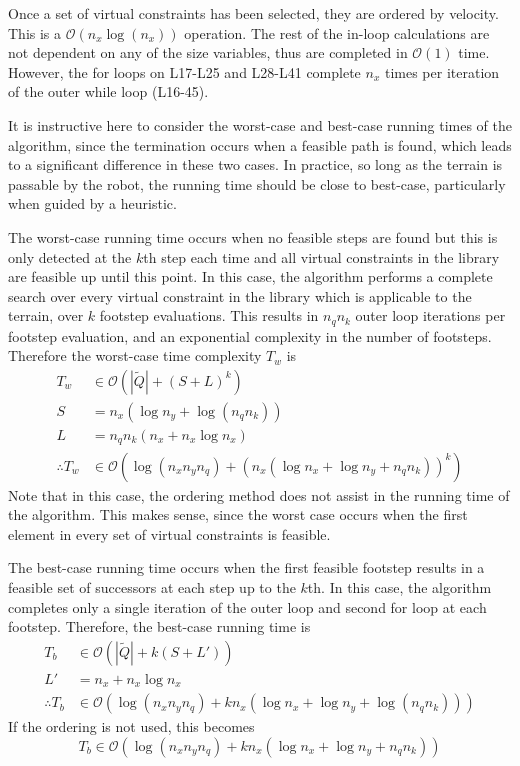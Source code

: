 Once a set of virtual constraints has been selected, they are ordered by velocity. This is a $\mathcal{O}(n_x\log(n_x))$ operation. The rest of the in-loop calculations are not dependent on any of the size variables, thus are completed in $\mathcal{O}(1)$ time. However, the for loops on L17-L25 and L28-L41 complete $n_x$ times per iteration of the outer while loop (L16-45).

It is instructive here to consider the worst-case and best-case running times of the algorithm, since the termination occurs when a feasible path is found, which leads to a significant difference in these two cases. In practice, so long as the terrain is passable by the robot, the running time should be close to best-case, particularly when guided by a heuristic.

The worst-case running time occurs when no feasible steps are found but this is only detected at the $k$th step each time and all virtual constraints in the library are feasible up until this point. In this case, the algorithm performs a complete search over every virtual constraint in the library which is applicable to the terrain, over $k$ footstep evaluations. This results in $n_qn_k$ outer loop iterations per footstep evaluation, and an exponential complexity in the number of footsteps. Therefore the worst-case time complexity $T_w$ is
\begin{align*}
	T_w &\in \mathcal{O}\left(|\tilde{Q}| + (S + L)^k\right) \\
	S &= n_x(\log n_y + \log(n_qn_k)) \\
	L &= n_qn_k(n_x + n_x\log n_x) \\
	\therefore T_w &\in \mathcal{O}\left(\log(n_xn_yn_q)+(n_x(\log n_x + \log n_y + n_qn_k))^k\right)
\end{align*}
Note that in this case, the ordering method does not assist in the running time of the algorithm. This makes sense, since the worst case occurs when the first element in every set of virtual constraints is feasible.

The best-case running time occurs when the first feasible footstep results in a feasible set of successors at each step up to the $k$th. In this case, the algorithm completes only a single iteration of the outer loop and second for loop at each footstep. Therefore, the best-case running time is
\begin{align*}
	T_b &\in \mathcal{O}\left(|\tilde{Q}| + k(S + L')\right) \\
	L' &= n_x + n_x\log n_x \\
	\therefore T_b &\in \mathcal{O}\left(\log(n_xn_yn_q)+kn_x(\log n_x + \log n_y + \log(n_qn_k))\right)
\end{align*}
If the ordering is not used, this becomes
\[
T_b \in \mathcal{O}\left(\log(n_xn_yn_q)+kn_x(\log n_x + \log n_y + n_qn_k)\right)
\]

